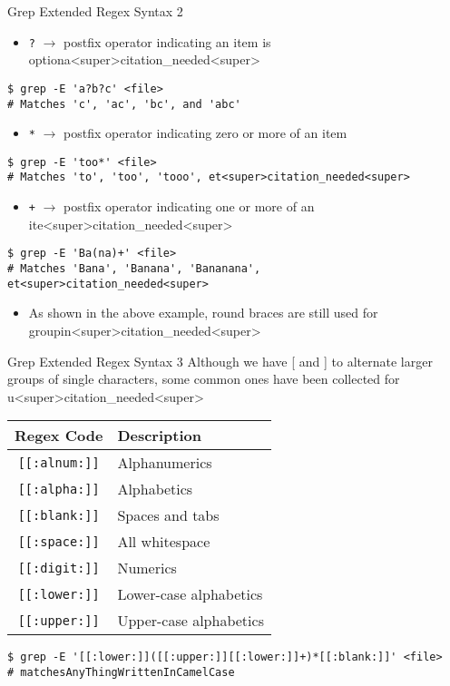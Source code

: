 \documentclass[11pt]{beamer}
\begin{document}
\begin{frame}[fragile=singleslide]{Grep Extended Regex Syntax 2}
\begin{itemize}
\item \texttt{?} $\rightarrow$ postfix operator indicating an item is optiona<super>citation_needed<super> 
\end{itemize}
\begin{lstlisting}[style=terminal]
$ grep -E 'a?b?c' <file>
# Matches 'c', 'ac', 'bc', and 'abc' 
\end{lstlisting}
\begin{itemize}
\item \texttt{*} $\rightarrow$ postfix operator indicating zero or more of an item 
\end{itemize}
\begin{lstlisting}[style=terminal]
$ grep -E 'too*' <file>
# Matches 'to', 'too', 'tooo', et<super>citation_needed<super>
\end{lstlisting}
\begin{itemize}
\item \texttt{+} $\rightarrow$ postfix operator indicating one or more of an ite<super>citation_needed<super>
\end{itemize}
\begin{lstlisting}[style=terminal]
$ grep -E 'Ba(na)+' <file>
# Matches 'Bana', 'Banana', 'Bananana', et<super>citation_needed<super>
\end{lstlisting}
\begin{itemize}
\item As shown in the above example, round braces are still used for groupin<super>citation_needed<super> 
\end{itemize}
\end{frame}

\begin{frame}[fragile=singleslide]{Grep Extended Regex Syntax 3}
Although we have [ and ] to alternate larger groups of single characters, some common ones have been collected for u<super>citation_needed<super>
\vspace{<super>citation_needed<super>5em}
\center 
\begin{tabular}{| c | l |}
\hline
Regex Code & Description \\ \hline
\texttt{[[:alnum:]]} & Alphanumerics \\ \hline
\texttt{[[:alpha:]]} & Alphabetics \\ \hline
\texttt{[[:blank:]]} & Spaces and tabs \\ \hline
\texttt{[[:space:]]} & All whitespace \\ \hline
\texttt{[[:digit:]]} & Numerics \\ \hline
\texttt{[[:lower:]]} & Lower-case alphabetics \\ \hline
\texttt{[[:upper:]]} & Upper-case alphabetics \\ \hline
\end{tabular}
\flushleft
\begin{lstlisting}[style=terminal]
$ grep -E '[[:lower:]]([[:upper:]][[:lower:]]+)*[[:blank:]]' <file>
# matchesAnyThingWrittenInCamelCase 
\end{lstlisting}
\end{frame}
\end{document}
